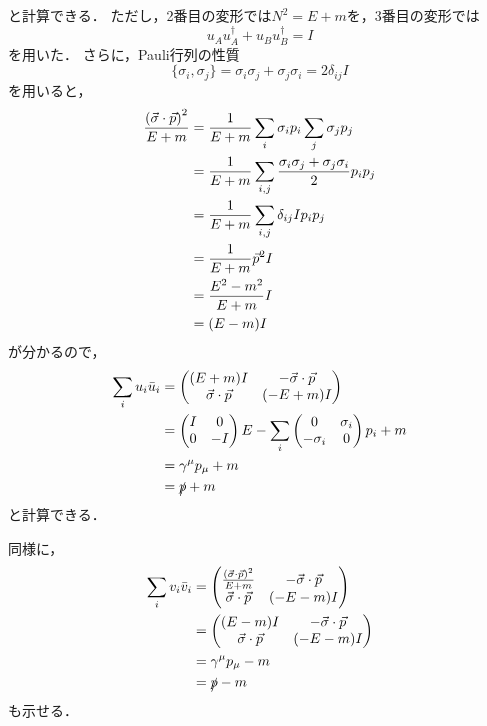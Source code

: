 と計算できる．
ただし，2番目の変形では$N^2=E+m$を，3番目の変形では
\begin{equation}
  u_A u_A^{\dagger} + u_B u_B^{\dagger} = I
\end{equation}
を用いた．
さらに，Pauli行列の性質
\begin{equation}
  \{\sigma_i, \sigma_j \} = \sigma_i\sigma_j + \sigma_j \sigma_i = 2\delta_{ij}I
\end{equation}
を用いると，
\begin{align}
  \frac{\left(\vec{\sigma}\cdot \vec{p}\right)^2}{E+m} &= \frac{1}{E+m} \sum_i \sigma_i p_i \sum_j \sigma_j p_j \notag\\
  &= \frac{1}{E+m} \sum_{i,j} \frac{\sigma_i\sigma_j + \sigma_j \sigma_i}{2}p_i p_j \notag\\
  &= \frac{1}{E+m} \sum_{i,j} \delta_{ij} I p_i p_j \notag\\
  &= \frac{1}{E+m}\vec{p}^2 I \notag\\
  &= \frac{E^2-m^2}{E+m} I \notag\\
  &= (E-m)I
\end{align}
が分かるので，
\begin{align}
  \sum_i u_i \bar{u}_i &= 
  \begin{pmatrix}
    (E+m)I & - \vec{\sigma}\cdot \vec{p} \\
    \vec{\sigma}\cdot \vec{p} & (-E+m)I \\
  \end{pmatrix}
  \notag\\
  &= 
  \begin{pmatrix}
    I & 0 \\
    0 & -I \\
  \end{pmatrix}
  E - \sum_i
  \begin{pmatrix}
    0 & \sigma_i \\
    -\sigma_i & 0 \\
  \end{pmatrix}
  p_i + m \notag\\
  &= \gamma^{\mu}p_{\mu} + m \notag\\
  &= \slashed{p} + m
\end{align}
と計算できる．

同様に，
\begin{align}
  \sum_{i} v_i \bar{v}_i &= 
  \begin{pmatrix}
    \frac{\left(\vec{\sigma}\cdot \vec{p}\right)^2}{E+m} & -\vec{\sigma}\cdot\vec{p}\\
    \vec{\sigma}\cdot\vec{p} &  (-E-m)I \\
  \end{pmatrix} 
  \notag\\
  &= 
  \begin{pmatrix}
    (E-m)I & -\vec{\sigma}\cdot\vec{p}\\
    \vec{\sigma}\cdot\vec{p} &  (-E-m)I \\
  \end{pmatrix} 
  \notag\\
  &= \gamma^{\mu} p_{\mu} - m \notag\\
  &= \slashed{p} - m
\end{align}
も示せる．

